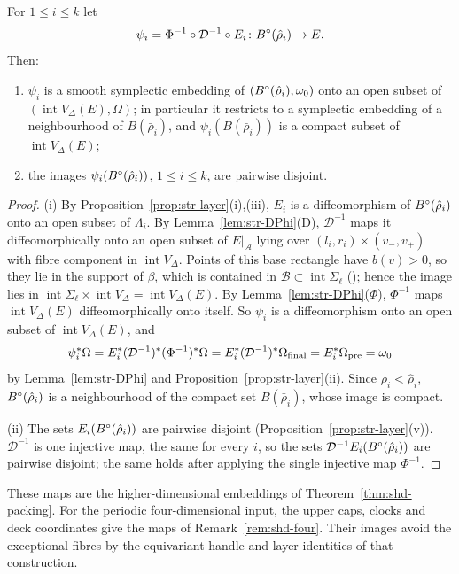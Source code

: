 \begin{proposition}\label{prop:str-embeddings}
For $1\le i\le k$ let
\[
 \psi_i=\Phi^{-1}\circ\mathcal D^{-1}\circ E_i\colon B^{\circ}(\hat\rho_i)\to E .
\]
Then:
\begin{enumerate}[label=(\roman*)]
\item $\psi_i$ is a smooth symplectic embedding of $(B^{\circ}(\hat\rho_i),\omega_0)$ onto an open subset of
$(\operatorname{int}V_\Delta(E),\Omega)$; in particular it restricts to a symplectic embedding of a neighbourhood of
$B(\bar\rho_i)$, and $\psi_i(B(\bar\rho_i))$ is a compact subset of $\operatorname{int}V_\Delta(E)$;
\item the images $\psi_i(B^{\circ}(\hat\rho_i))$, $1\le i\le k$, are pairwise disjoint.
\end{enumerate}
\end{proposition}

\begin{proof}
(i) By Proposition~\ref{prop:str-layer}(i),(iii), $E_i$ is a diffeomorphism of $B^{\circ}(\hat\rho_i)$ onto an open subset of
$\Lambda_i$. By Lemma~\ref{lem:str-DPhi}(D), $\mathcal D^{-1}$ maps it diffeomorphically onto an open subset of
$E|_{\mathcal A}$ lying over $(l_i,r_i)\times(v_-,v_+)$ with fibre component in $\operatorname{int}V_\Delta$. Points of this base
rectangle have $b(v)>0$, so they lie in the support of $\beta$, which is contained in $\mathcal B\subset\operatorname{int}\Sigma_\ell$
(); hence the image lies in $\operatorname{int}\Sigma_\ell\times\operatorname{int}V_\Delta
=\operatorname{int}V_\Delta(E)$. By
Lemma~\ref{lem:str-DPhi}($\Phi$), $\Phi^{-1}$ maps $\operatorname{int}V_\Delta(E)$ diffeomorphically onto itself. So $\psi_i$ is a
diffeomorphism onto an open subset of $\operatorname{int}V_\Delta(E)$, and
\[
 \psi_i^*\Omega=E_i^*(\mathcal D^{-1})^*(\Phi^{-1})^*\Omega=E_i^*(\mathcal D^{-1})^*\Omega_{\rm final}=E_i^*\Omega_{\rm pre}=\omega_0
\]
by Lemma~\ref{lem:str-DPhi} and Proposition~\ref{prop:str-layer}(ii). Since $\bar\rho_i<\hat\rho_i$, $B^{\circ}(\hat\rho_i)$ is a
neighbourhood of the compact set $B(\bar\rho_i)$, whose image is compact.

(ii) The sets $E_i(B^{\circ}(\hat\rho_i))$ are pairwise disjoint (Proposition~\ref{prop:str-layer}(v)). $\mathcal D^{-1}$ is one
injective map, the same for every $i$, so the sets $\mathcal D^{-1}E_i(B^{\circ}(\hat\rho_i))$ are pairwise disjoint; the same holds
after applying the single injective map $\Phi^{-1}$.
\end{proof}

These maps are the higher-dimensional embeddings of Theorem~\ref{thm:shd-packing}.
For the periodic four-dimensional input, the upper caps, clocks and deck
coordinates give the maps of Remark~\ref{rem:shd-four}. Their images avoid the exceptional
fibres by the equivariant handle and layer identities of that construction.
